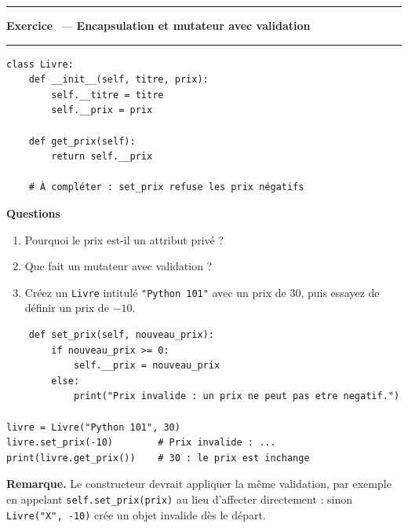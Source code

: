 \documentclass[10pt,a4paper]{article}
\newif\ifcorrige
\newcommand{\py}[1]{\texttt{#1}}
\newcounter{exo}
\newcommand{\exo}[1]{%
  \stepcounter{exo}\par\vspace{4pt}
  \ifcorrige\else\noindent\minipage{\textwidth}\fi
  \noindent\textcolor{qbar}{\rule{2.5pt}{10pt}}\hspace{4pt}%
  \textbf{\color{qbar}Exercice \theexo}\ --- \textbf{#1}%
  \par\nobreak\vspace{-3pt}\noindent\textcolor{qbar!35}{\rule{\textwidth}{0.6pt}}%
  \par\nobreak\vspace{1pt}}
\newenvironment{codebloc}
  {\ifcorrige\else\noindent\minipage[t]{0.50\textwidth}\vspace{0pt}\fi}
  {\ifcorrige\else\endminipage\hfill\fi}
\newenvironment{qbloc}
  {\ifcorrige\else\minipage[t]{0.475\textwidth}\vspace{0pt}\fi
   \textbf{\small Questions}\begin{enumerate}[leftmargin=*,nosep,label=\arabic*.]}
  {\end{enumerate}\ifcorrige\else\endminipage\par\fi}
\newcommand{\rep}[1]{\ifcorrige\par\smallskip{\color{corr}\small#1}\par\smallskip\fi}
\newlength{\zoneadj}\setlength{\zoneadj}{0pt}
\newcommand{\zone}[1][4cm]{%
  \ifcorrige\else
    \par\vspace{2pt}\noindent
    \begin{tcolorbox}[colback=white,colframe=black!45,boxrule=0.5pt,arc=1pt,height={\dimexpr#1-\zoneadj\relax},
      left=4pt,right=4pt,top=2pt,bottom=2pt,
      title={\scriptsize\itshape Réponses},coltitle=black!55,fonttitle=\itshape,
      detach title,before upper={\tcbtitle\par}]\end{tcolorbox}%
    \endminipage\par
  \fi}
\newenvironment{solution}
  {\ifcorrige
     \begin{tcolorbox}[enhanced,breakable,colback=corrbg,colframe=corr,boxrule=0.6pt,arc=1pt,
       left=5pt,right=5pt,top=3pt,bottom=3pt,fontupper=\small,
       title={Corrigé},coltitle=corr,fonttitle=\bfseries\small,detach title,
       before upper={\tcbtitle\par\smallskip}]%
   \else
     \setbox0\vbox\bgroup
   \fi}
  {\ifcorrige\end{tcolorbox}\else\egroup\fi}
\begin{document}
\exo{Encapsulation et mutateur avec validation}
\begin{codebloc}
\begin{lstlisting}
class Livre:
    def __init__(self, titre, prix):
        self.__titre = titre
        self.__prix = prix

    def get_prix(self):
        return self.__prix

    # À compléter : set_prix refuse les prix négatifs
\end{lstlisting}
\end{codebloc}
\begin{qbloc}
  \item Pourquoi le prix est-il un attribut privé ?
    \rep{Parce qu'un prix doit respecter une règle métier : il ne peut pas être négatif. Le rendre
    privé interdit l'écriture directe et oblige à passer par une méthode qui applique cette règle.}
  \item Que fait un mutateur avec validation ?
    \rep{Il vérifie la valeur reçue avant de l'affecter. Si elle est valide, il met l'attribut à
    jour ; sinon il refuse la modification et l'objet conserve son état précédent, qui reste
    cohérent.}
  \item Créez un \py{Livre} intitulé \py{"Python 101"} avec un prix de 30, puis essayez de définir
    un prix de $-10$.
\end{qbloc}
\zone[4.0cm]
\begin{solution}
\begin{lstlisting}
    def set_prix(self, nouveau_prix):
        if nouveau_prix >= 0:
            self.__prix = nouveau_prix
        else:
            print("Prix invalide : un prix ne peut pas etre negatif.")

livre = Livre("Python 101", 30)
livre.set_prix(-10)        # Prix invalide : ...
print(livre.get_prix())    # 30 : le prix est inchange
\end{lstlisting}
\textbf{Remarque.} Le constructeur devrait appliquer la même validation, par exemple en appelant
\py{self.set_prix(prix)} au lieu d'affecter directement : sinon \py{Livre("X", -10)} crée un objet
invalide dès le départ.
\end{solution}
\end{document}

